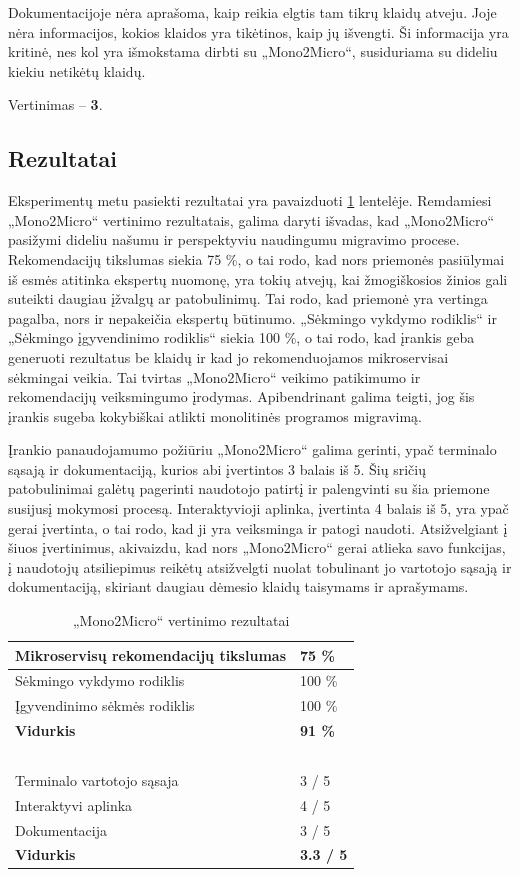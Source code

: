 \documentclass{VUMIFPSbakalaurinis}
\begin{document}
Dokumentacijoje nėra aprašoma, kaip reikia elgtis tam tikrų klaidų atveju. Joje nėra informacijos, kokios klaidos yra tikėtinos, kaip jų išvengti. Ši informacija yra kritinė, nes kol yra išmokstama dirbti su „Mono2Micro“, susiduriama su dideliu kiekiu netikėtų klaidų.

Vertinimas -- \textbf{3}.

\subsection{Rezultatai}
Eksperimentų metu pasiekti rezultatai yra pavaizduoti \ref{table:rezultatai} lentelėje. Remdamiesi „Mono2Micro“ vertinimo rezultatais, galima daryti išvadas, kad „Mono2Micro“ pasižymi dideliu našumu ir perspektyviu naudingumu migravimo procese. Rekomendacijų tikslumas siekia 75 \%, o tai rodo, kad nors priemonės pasiūlymai iš esmės atitinka ekspertų nuomonę, yra tokių atvejų, kai žmogiškosios žinios gali suteikti daugiau įžvalgų ar patobulinimų. Tai rodo, kad priemonė yra vertinga pagalba, nors ir nepakeičia ekspertų būtinumo. „Sėkmingo vykdymo rodiklis“ ir „Sėkmingo įgyvendinimo rodiklis“ siekia 100 \%, o tai rodo, kad įrankis geba generuoti rezultatus be klaidų ir kad jo rekomenduojamos mikroservisai sėkmingai veikia. Tai tvirtas „Mono2Micro“ veikimo patikimumo ir rekomendacijų veiksmingumo įrodymas. Apibendrinant galima teigti, jog šis įrankis sugeba kokybiškai atlikti monolitinės programos migravimą.

Įrankio panaudojamumo požiūriu „Mono2Micro“ galima gerinti, ypač terminalo sąsają ir dokumentaciją, kurios abi įvertintos 3 balais iš 5. Šių sričių patobulinimai galėtų pagerinti naudotojo patirtį ir palengvinti su šia priemone susijusį mokymosi procesą. Interaktyvioji aplinka, įvertinta 4 balais iš 5, yra ypač gerai įvertinta, o tai rodo, kad ji yra veiksminga ir patogi naudoti. Atsižvelgiant į šiuos įvertinimus, akivaizdu, kad nors „Mono2Micro“ gerai atlieka savo funkcijas, į naudotojų atsiliepimus reikėtų atsižvelgti nuolat tobulinant jo vartotojo sąsają ir dokumentaciją, skiriant daugiau dėmesio klaidų taisymams ir aprašymams.

\begin{table}[!ht]
    \centering
    \caption{„Mono2Micro“ vertinimo rezultatai}
    \label{table:rezultatai}
    \begin{tabular}{|l|l|}
    \hline
        Mikroservisų rekomendacijų tikslumas & 75 \% \\ \hline
        Sėkmingo vykdymo rodiklis & 100 \% \\ \hline
        Įgyvendinimo sėkmės rodiklis & 100 \% \\ \hline
        \textbf{Vidurkis} & \textbf{91 \%} \\ \hline
        ~ & ~ \\ \hline
        Terminalo vartotojo sąsaja & 3 / 5 \\ \hline
        Interaktyvi aplinka & 4 / 5 \\ \hline
        Dokumentacija & 3 / 5 \\ \hline
        \textbf{Vidurkis} & \textbf{3.3 / 5} \\ \hline
    \end{tabular}
\end{table}
\end{document}
